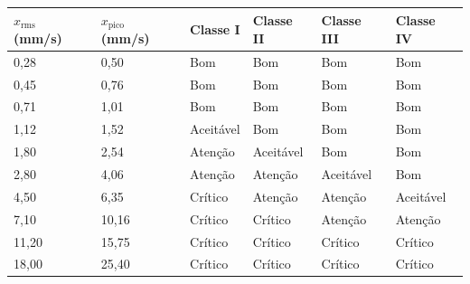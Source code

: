 \documentclass[conference]{IEEEtran}
\begin{document}
\begin{table}[!t]
\centering
\renewcommand{\tablename}{Quadro}
\renewcommand{\arraystretch}{1.3}
\small
\begin{tabular}{|C{1.05cm}|C{1.05cm}|C{1.05cm}|C{1.05cm}|C{1.05cm}|C{1.05cm}|}
\hline
\textbf{$x_{\text{rms}}$ (mm/s)} &
\textbf{$x_{\text{pico}}$ (mm/s)} &
\textbf{Classe I} &
\textbf{Classe II} &
\textbf{Classe III} &
\textbf{Classe IV} \\
\hline

0,28 & 0,50 &
 Bom &
 Bom &
 Bom &
 Bom \\
\hline

0,45 & 0,76 &
 Bom &
 Bom &
 Bom &
 Bom \\
\hline

0,71 & 1,01 &
 Bom &
 Bom &
 Bom &
 Bom \\
\hline

1,12 & 1,52 &
 Aceitável &
 Bom &
 Bom &
 Bom \\
\hline

1,80 & 2,54 &
 Atenção &
 Aceitável &
 Bom &
 Bom \\
\hline

2,80 & 4,06 &
 Atenção &
 Atenção &
 Aceitável &
 Bom \\
\hline

4,50 & 6,35 &
 Crítico &
 Atenção &
 Atenção &
 Aceitável \\
\hline

7,10 & 10,16 &
 Crítico &
 Crítico &
 Atenção &
 Atenção \\
\hline

11,20 & 15,75 &
 Crítico &
 Crítico &
 Crítico &
 Crítico \\
\hline

18,00 & 25,40 &
 Crítico &
 Crítico &
 Crítico &
 Crítico \\
\hline


\end{tabular}
\end{table}
\end{document}
